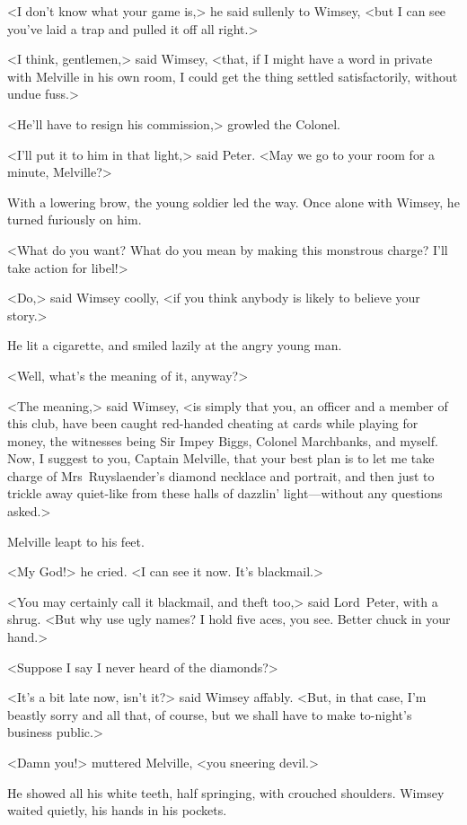 <I don't know what your game is,> he said sullenly to Wimsey, <but I can see you've laid a trap and pulled it off all right.>

<I think, gentlemen,> said Wimsey, <that, if I might have a word in private with Melville in his own room, I could get the thing settled satisfactorily, without undue fuss.>

<He'll have to resign his commission,> growled the Colonel.

<I'll put it to him in that light,> said Peter. <May we go to your room for a minute, Melville?>

With a lowering brow, the young soldier led the way. Once alone with Wimsey, he turned furiously on him.

<What do you want? What do you mean by making this monstrous charge? I'll take action for libel!>

<Do,> said Wimsey coolly, <if you think anybody is likely to believe your story.>

He lit a cigarette, and smiled lazily at the angry young man.

<Well, what's the meaning of it, anyway?>

<The meaning,> said Wimsey, <is simply that you, an officer and a member of this club, have been caught red-handed cheating at cards while playing for money, the witnesses being Sir Impey Biggs, Colonel Marchbanks, and myself. Now, I suggest to you, Captain Melville, that your best plan is to let me take charge of Mrs~Ruyslaender's diamond necklace and portrait, and then just to trickle away quiet-like from these halls of dazzlin' light—without any questions asked.>

Melville leapt to his feet.

<My God!> he cried. <I can see it now. It's blackmail.>

<You may certainly call it blackmail, and theft too,> said Lord~Peter, with a shrug. <But why use ugly names? I hold five aces, you see. Better chuck in your hand.>

<Suppose I say I never heard of the diamonds?>

<It's a bit late now, isn't it?> said Wimsey affably. <But, in that case, I'm beastly sorry and all that, of course, but we shall have to make to-night's business public.>

<Damn you!> muttered Melville, <you sneering devil.>

He showed all his white teeth, half springing, with crouched shoulders. Wimsey waited quietly, his hands in his pockets.

